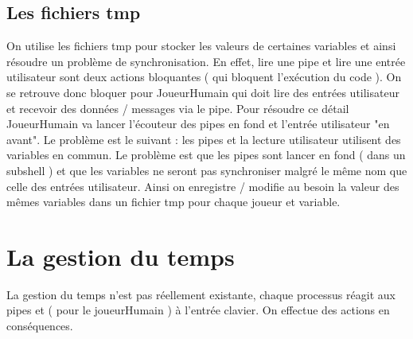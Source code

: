 \documentclass{article}
\begin{document}
\subsection{Les fichiers tmp}
On utilise les fichiers tmp pour stocker les valeurs de certaines variables et ainsi résoudre un problème de synchronisation. En effet, lire une pipe et lire une entrée utilisateur sont deux actions bloquantes ( qui bloquent l'exécution du code ). On se retrouve donc bloquer pour JoueurHumain qui doit lire des entrées utilisateur et recevoir des données / messages via le pipe. Pour résoudre ce détail JoueurHumain va lancer l'écouteur des pipes en fond et l'entrée utilisateur "en avant". Le problème est le suivant : les pipes et la lecture utilisateur utilisent des variables en commun. Le problème est que les pipes sont lancer en fond ( dans un subshell ) et que les variables ne seront pas synchroniser malgré le même nom que celle des entrées utilisateur. Ainsi on enregistre / modifie au besoin la valeur des mêmes variables dans un fichier tmp pour chaque joueur et variable.   

\section{La gestion du temps}

La gestion du temps n'est pas réellement existante, chaque processus réagit aux pipes et ( pour le joueurHumain ) à l'entrée clavier. On effectue des actions en conséquences. 


\end{document}
